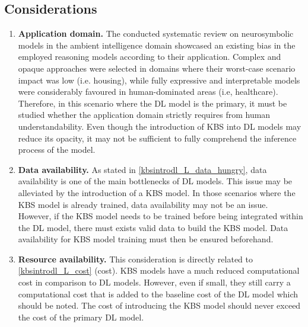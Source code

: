\subsection{Considerations}
\begin{enumerate} [start=1,label={\bfseries C\arabic*.}]
    \item \label{kbsintrodl_C_domain} \textbf{Application domain.} The conducted systematic review on neurosymbolic models in the ambient intelligence domain \citep{amador_systematic_review_2019}  showcased an existing bias in the employed reasoning models according to their application. Complex and opaque approaches were selected in domains where their worst-case scenario impact was low (i.e. housing), while fully expressive and interpretable models were considerably favoured in human-dominated areas (i.e, healthcare). Therefore, in this scenario where the DL model is the primary, it must be studied whether the application domain strictly requires from human understandability. Even though the introduction of KBS into DL models may reduce its opacity, it may not be sufficient to fully comprehend the inference process of the model. 
    
    \item  \label{kbsintrodl_C_data} \textbf{Data availability.} As stated in \ref{kbsintrodl_L_data_hungry}, data availability is one of the main bottlenecks of DL models. This issue may be alleviated by the introduction of a KBS model. In those scenarios where the KBS model is already trained, data availability may not be an issue. However, if the KBS model needs to be trained before being integrated within the DL model, there must exists valid data to build the KBS model. Data availability for KBS model training must then be ensured beforehand.
    
    \item  \label{kbsintrodl_C_resource} \textbf{Resource availability.} This consideration is directly related to \ref{kbsintrodl_L_cost} (cost). KBS models have a much reduced computational cost in comparison to DL models. However, even if small, they still carry a computational cost that is added to the baseline cost of the DL model which should be noted. The cost of introducing the KBS model should never exceed the cost of the primary DL model.
    
\end{enumerate}
